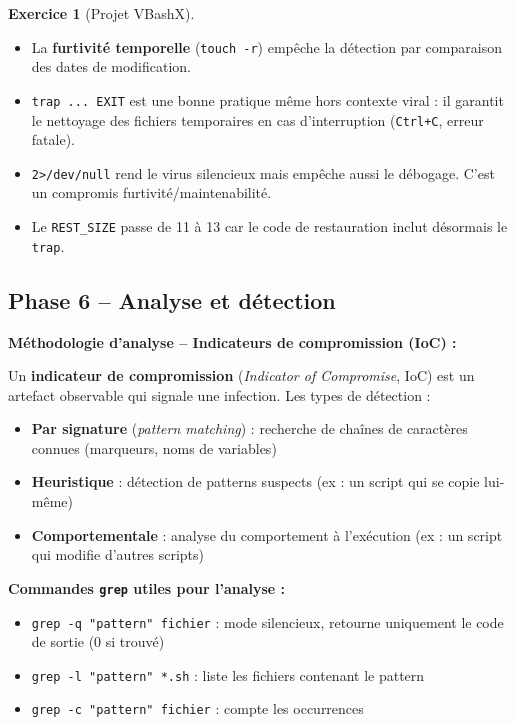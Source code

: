 \documentclass[a4paper,11pt]{article}
\theoremstyle{plain}
\theoremstyle{definition}
\newtheorem{exercice}{Exercice}
\begin{document}
\begin{exercice}[Projet VBashX]
\begin{correction}
\begin{pointcle}
\begin{itemize}
    \item La \textbf{furtivité temporelle} (\texttt{touch -r}) empêche la détection par comparaison des dates de modification.
    \item \texttt{trap ... EXIT} est une bonne pratique même hors contexte viral : il garantit le nettoyage des fichiers temporaires en cas d'interruption (\texttt{Ctrl+C}, erreur fatale).
    \item \texttt{2>/dev/null} rend le virus silencieux mais empêche aussi le débogage. C'est un compromis furtivité/maintenabilité.
    \item Le \texttt{REST\_SIZE} passe de 11 à 13 car le code de restauration inclut désormais le \texttt{trap}.
\end{itemize}
\end{pointcle}

\end{correction}



\subsection*{Phase 6 -- Analyse et détection}

\begin{rappel}
\textbf{Méthodologie d'analyse -- Indicateurs de compromission (IoC) :}

Un \textbf{indicateur de compromission} (\textit{Indicator of Compromise}, IoC) est un artefact observable qui signale une infection. Les types de détection :
\begin{itemize}
    \item \textbf{Par signature} (\textit{pattern matching}) : recherche de chaînes de caractères connues (marqueurs, noms de variables)
    \item \textbf{Heuristique} : détection de patterns suspects (ex : un script qui se copie lui-même)
    \item \textbf{Comportementale} : analyse du comportement à l'exécution (ex : un script qui modifie d'autres scripts)
\end{itemize}

\textbf{Commandes \texttt{grep} utiles pour l'analyse :}
\begin{itemize}
    \item \texttt{grep -q "pattern" fichier} : mode silencieux, retourne uniquement le code de sortie (0 si trouvé)
    \item \texttt{grep -l "pattern" *.sh} : liste les fichiers contenant le pattern
    \item \texttt{grep -c "pattern" fichier} : compte les occurrences
\end{itemize}
\end{rappel}


\end{exercice}
\end{document}

